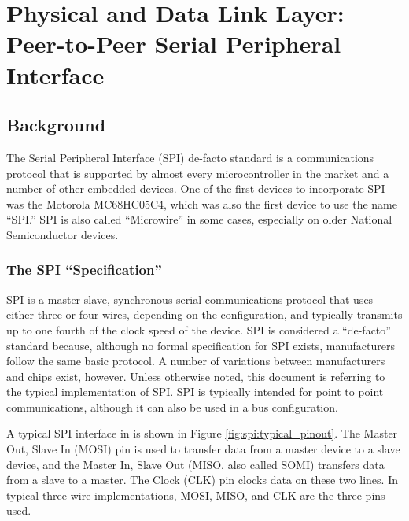 \chapter{Physical and Data Link Layer:\\ Peer-to-Peer Serial Peripheral Interface}\label{sec:spi}

\section{Background}\label{sec:spi:background}

The Serial Peripheral Interface (SPI) de-facto standard is a communications protocol that is supported by almost every microcontroller in the market and a number of other embedded devices. One of the first devices to incorporate SPI was the Motorola MC68HC05C4, which was also the first device to use the name ``SPI.'' \cite{ref:1994-motorola-spi} SPI is also called ``Microwire'' in some cases, especially on older National Semiconductor devices. \cite{ref:1995-national_semiconductor-microwire}

\subsection{The SPI ``Specification''}\label{sec:spi:background:spi_specification}

SPI is a master-slave, synchronous serial communications protocol that uses either three or four wires, depending on the configuration, and typically transmits up to one fourth of the clock speed of the device. SPI is considered a ``de-facto'' standard because, although no formal specification for SPI exists, manufacturers follow the same basic protocol. A number of variations between manufacturers and chips exist, however. Unless otherwise noted, this document is referring to the typical implementation of SPI. SPI is typically intended for point to point communications, although it can also be used in a bus configuration. 

A typical SPI interface in is shown in Figure \ref{fig:spi:typical_pinout}. The Master Out, Slave In (MOSI) pin is used to transfer data from a master device to a slave device, and the Master In, Slave Out (MISO, also called SOMI) transfers data from a slave to a master. The Clock (CLK) pin clocks data on these two lines. In typical three wire implementations, MOSI, MISO, and CLK are the three pins used.

